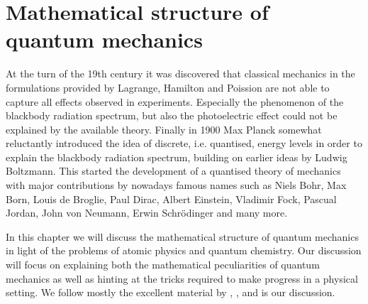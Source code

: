 \chapter{Mathematical structure of quantum mechanics}


At the turn of the 19th century it was discovered
that classical mechanics in the formulations provided
by Lagrange, Hamilton and Poission
are not able to capture all effects observed in experiments.
Especially the phenomenon of the blackbody radiation spectrum,
but also the photoelectric effect could not be explained by the available theory.
Finally in 1900 Max Planck somewhat reluctantly introduced the idea of
discrete, i.e. quantised, energy levels
in order to explain the blackbody radiation spectrum,
building on earlier ideas by Ludwig Boltzmann.
This started the development of a quantised theory of mechanics
with major contributions by nowadays famous
names such as Niels Bohr, Max Born, Louis de Broglie, Paul Dirac, Albert Einstein, Vladimir Fock, Pascual Jordan, John von Neumann, Erwin Schrödinger and many more.

In this chapter we will discuss the mathematical structure
of quantum mechanics in light of the problems of atomic physics
and quantum chemistry.
Our discussion will focus on explaining both the mathematical
peculiarities of quantum mechanics as well as hinting
at the tricks required to make progress in a physical setting.
We follow mostly the excellent material by \citet{Shankar1994},
\citet{Mueller2000}, \citet{Davies2007} and \citet{Helffer2013} is our discussion.





